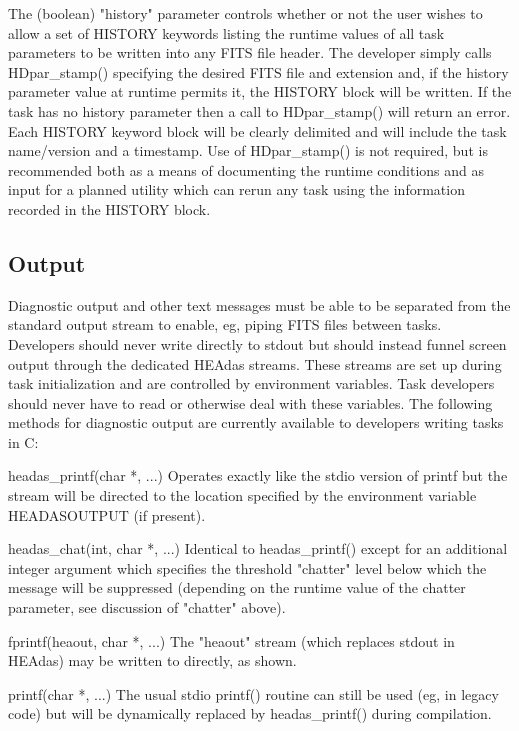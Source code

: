 \documentclass[11pt]{book}
\begin{document}
\begin{itemize}
The (boolean) "history" parameter controls whether or not
the user wishes to allow a set of HISTORY keywords
listing the runtime values of all task parameters to be
written into any FITS file header. The developer simply
calls HDpar\_stamp() specifying the desired FITS file
and extension and, if the history parameter value at runtime
permits it, the HISTORY block will be written. If the task
has no history parameter then a call to
HDpar\_stamp() will return an error. Each HISTORY
keyword block will be clearly delimited and will include the
task name/version and a timestamp. Use of
HDpar\_stamp() is not required, but is recommended
both as a means of documenting the runtime conditions and
as input for a planned utility which can rerun any task using
the information recorded in the HISTORY block.
\end{itemize}

\subsection{Output}

Diagnostic output and other text messages must be able to be
separated from the standard output stream to enable, eg, piping
FITS files between tasks. Developers should never write directly
to stdout but should instead funnel screen output through the
dedicated HEAdas streams. These streams are set up during task
initialization and are controlled by environment variables. Task
developers should never have to read or otherwise deal with these
variables. The following methods for diagnostic output are
currently available to developers writing tasks in C:

      headas\_printf(char *, ...)
      Operates exactly like the stdio version of printf but the
      stream will be directed to the location specified by the
      environment variable HEADASOUTPUT (if present).

      headas\_chat(int, char *, ...)
      Identical to headas\_printf() except for an additional
      integer argument which specifies the threshold "chatter"
      level below which the message will be suppressed
      (depending on the runtime value of the chatter parameter,
      see discussion of "chatter" above).

      fprintf(heaout, char *, ...)
      The "heaout" stream (which replaces stdout in HEAdas)
      may be written to directly, as shown.

      printf(char *, ...)
      The usual stdio printf() routine can still be used (eg, in
      legacy code) but will be dynamically replaced by
      headas\_printf() during compilation.
\end{document}

